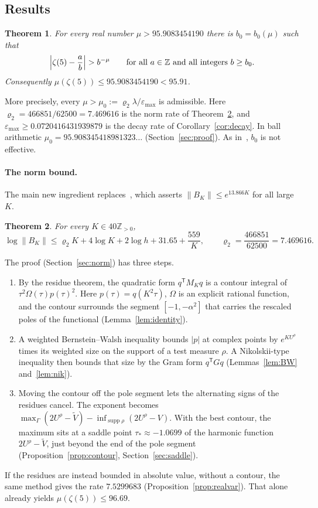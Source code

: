\documentclass[11pt]{article}
\newtheorem{theorem}{Theorem}
\theoremstyle{remark}
\newcommand{\Z}{\mathbb{Z}}
\newcommand{\Vt}{\widetilde{V}}
\newcommand{\epsmax}{\varepsilon_{\max}}
\newcommand{\T}{\mathsf{T}}
\DeclareMathOperator{\supp}{supp}
\begin{document}
\subsection{Results}

\begin{theorem}\label{thm:main}
For every real number $\mu>95.9083454190$ there is $b_0=b_0(\mu)$ such that
\[
\Bigl|\zeta(5)-\frac ab\Bigr|>b^{-\mu}\qquad\text{for all }a\in\Z\text{ and all integers }b\ge b_0 .
\]
Consequently $\mu(\zeta(5))\le95.9083454190<95.91$.
\end{theorem}

More precisely, every $\mu>\mu_0:=\varrho_2\lambda/\epsmax$ is admissible. Here $\varrho_2=466851/62500=7.469616$ is the norm rate of Theorem~\ref{thm:norm}, and $\epsmax\ge0.0720416431939879$ is the decay rate of Corollary~\ref{cor:decay}. In ball arithmetic $\mu_0=95.908345418981323\ldots$ (Section~\ref{sec:proof}). As in~\cite{F}, $b_0$ is not effective.

\paragraph{The norm bound.} The main new ingredient replaces~\cite[Prop.~C.1]{F}, which asserts $\|B_K\|\le e^{13.866K}$ for all large $K$.

\begin{theorem}\label{thm:norm}
For every $K\in40\Z_{>0}$,
\[
\log\|B_K\|\le\varrho_2K+4\log K+2\log h+31.65+\frac{559}{K},\qquad\varrho_2=\frac{466851}{62500}=7.469616 .
\]
\end{theorem}

The proof (Section~\ref{sec:norm}) has three steps.
\begin{enumerate}[label=(\roman*)]
\item By the residue theorem, the quadratic form $q^\T M_Kq$ is a contour integral of $\tau^2\Omega(\tau)p(\tau)^2$. Here $p(\tau)=q(K^2\tau)$, $\Omega$ is an explicit rational function, and the contour surrounds the segment $[-1,-\alpha^2]$ that carries the rescaled poles of the functional (Lemma~\ref{lem:identity}).
\item A weighted Bernstein--Walsh inequality bounds $|p|$ at complex points by $e^{KU^\rho}$ times its weighted size on the support of a test measure $\rho$. A Nikolskii-type inequality then bounds that size by the Gram form $q^\T Gq$ (Lemmas~\ref{lem:BW} and~\ref{lem:nik}).
\item Moving the contour off the pole segment lets the alternating signs of the residues cancel. The exponent becomes $\max_\Gamma(2U^\rho-\Vt)-\inf_{\supp\rho}(2U^\rho-V)$. With the best contour, the maximum sits at a saddle point $\tau_*\approx-1.0699$ of the harmonic function $2U^\rho-\Vt$, just beyond the end of the pole segment (Proposition~\ref{prop:contour}, Section~\ref{sec:saddle}).
\end{enumerate}
If the residues are instead bounded in absolute value, without a contour, the same method gives the rate $7.5299683$ (Proposition~\ref{prop:realvar}). That alone already yields $\mu(\zeta(5))\le96.69$.
\end{document}
